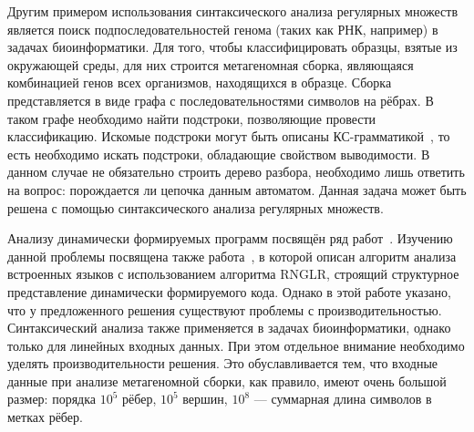 Другим примером использования синтаксического анализа регулярных множеств является поиск подпоследовательностей генома (таких как РНК, например) в задачах биоинформатики. Для того, чтобы классифицировать образцы, взятые из окружающей среды, для них строится метагеномная сборка, являющаяся комбинацией генов всех организмов, находящихся в образце. Сборка представляется в виде графа с последовательностями символов на рёбрах. В таком графе необходимо найти подстроки, позволяющие провести классификацию. Искомые подстроки могут быть описаны КС-грамматикой~\cite{Anderson}, то есть необходимо искать подстроки, обладающие свойством выводимости. В данном случае не обязательно строить дерево разбора, необходимо лишь ответить на вопрос: порождается ли цепочка данным автоматом. Данная задача может быть решена с помощью синтаксического анализа регулярных множеств.

Анализу динамически формируемых программ посвящён ряд работ~\cite{LrAbstract1, LrAbstract2, LRAbstractParsingSema}.  Изучению данной проблемы посвящена также работа~\cite{RelaxedARNGLR}, в которой описан алгоритм анализа встроенных языков с использованием алгоритма RNGLR, строящий структурное представление динамически формируемого кода. Однако в этой работе указано, что у предложенного решения существуют проблемы с производительностью. Синтаксический анализа также применяется в задачах биоинформатики, однако только для линейных входных данных. При этом отдельное внимание необходимо уделять производительности решения. Это обуславливается тем, что входные данные при анализе метагеномной сборки, как правило, имеют очень большой размер: порядка $10^5$ рёбер, $10^5$ вершин, $10^8$ --- суммарная длина символов в метках рёбер. 